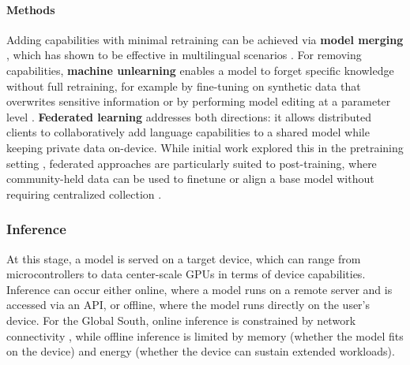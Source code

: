 \documentclass[11pt,a4paper]{article}
\begin{document}
\paragraph{Methods}
Adding capabilities with minimal retraining can be achieved via \textbf{model merging} \citep{yadav-etal-2023-tiesmerging}, which has shown to be effective in multilingual scenarios \citep[\textit{inter alia}]{huang-etal-2024-chat,aakanksha2024mix,tao-etal-2024-unlocking}.
For removing capabilities, \textbf{machine unlearning} \citep{liu-etal-2025-rethinking} enables a model to forget specific knowledge without full retraining, for example by fine-tuning on synthetic data that overwrites sensitive information \citep{yu2022differentially,yue-etal-2023-synthetic,yu-etal-2024-privacy} or by performing model editing at a parameter level \citep{choi-etal-2024-cross,hwang2025uncoveringpotentialrisksunlearning,farashah2026multilingualamnesiatransferabilityunlearning}.
\textbf{Federated learning} addresses both directions: it allows distributed clients to collaboratively add language capabilities to a shared model while keeping private data on-device.
While initial work explored this in the pretraining setting \citep{weller-etal-2022-pretrained}, federated approaches are particularly suited to post-training, where community-held data can be used to finetune or align a base model without requiring centralized collection \citep{zhao2024breaking,li-etal-2025-multilingual-federated}.

\subsubsection{Inference}
\label{sec:inference}

At this stage, a model is served on a target device, which can range from microcontrollers to data center-scale GPUs in terms of device capabilities.
Inference can occur either online, where a model runs on a remote server and is accessed via an API, or offline, where the model runs directly on the user's device.
For the Global South, online inference is constrained by network connectivity \citep{itu-unesco-2025-state}, while offline inference is limited by memory (whether the model fits on the device) and energy (whether the device can sustain extended workloads).
\end{document}
